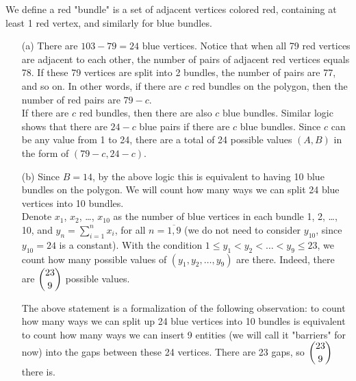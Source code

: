 \documentclass[11pt]{article}
\begin{document}
        \begin{solution}
            We define a red "bundle" is a set of adjacent vertices colored red, containing at least 1 red vertex, and similarly for blue bundles.
            \begin{enumerate}
                \item[(a)] There are \(103 - 79 = 24\) blue vertices. Notice that when all 79 red vertices are adjacent to each other, the number of pairs of adjacent red vertices equals 78. If these 79 vertices are split into 2 bundles, the number of pairs are 77, and so on. In other words, if there are \(c\) red bundles on the polygon, then the number of red pairs are \(79 - c\).\\
                If there are \(c\) red bundles, then there are also \(c\) blue bundles. Similar logic shows that there are \(24 - c\) blue pairs if there are \(c\) blue bundles. Since \(c\) can be any value from 1 to 24, there are a total of 24 possible values \((A,B)\) in the form of \((79 - c, 24 - c)\).

                \item[(b)] Since \(B = 14\), by the above logic this is equivalent to having 10 blue bundles on the polygon. We will count how many ways we can split 24 blue vertices into 10 bundles.\\
                Denote \(x_1\), \(x_2\), \dots, \(x_{10}\) as the number of blue vertices in each bundle 1, 2, \dots, 10, and \(y_n = \sum\limits_{i=1}^n x_i\), for all \(n = \overline{1,9}\) (we do not need to consider \(y_{10}\), since \(y_{10} = 24\) is a constant). With the condition \(1 \leq y_1 < y_2 < \dots < y_9 \leq 23\), we count how many possible values of \((y_1, y_2, \dots, y_9)\) are there. Indeed, there are \(\dbinom{23}{9}\) possible values.

                \begin{motivation}
                    The above statement is a formalization of the following observation: to count how many ways we can split up 24 blue vertices into 10 bundles is equivalent to count how many ways we can insert 9 entities (we will call it "barriers" for now) into the gaps between these 24 vertices. There are 23 gaps, so \(\dbinom{23}{9}\) there is.
                \end{motivation}


\end{enumerate}
\end{solution}
\end{document}

